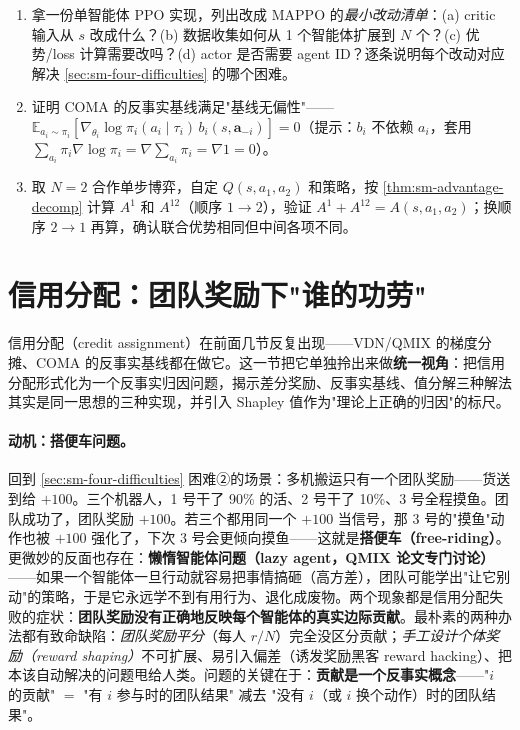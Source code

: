 \begin{practice}
\begin{enumerate}
  \item 拿一份单智能体 PPO 实现，列出改成 MAPPO 的\emph{最小改动清单}：(a) critic 输入从 $s$ 改成什么？(b) 数据收集如何从 1 个智能体扩展到 $N$ 个？(c) 优势/loss 计算需要改吗？(d) actor 是否需要 agent ID？逐条说明每个改动对应解决 \cref{sec:sm-four-difficulties} 的哪个困难。
  \item 证明 COMA 的反事实基线满足"基线无偏性"——$\mathbb{E}_{a_i\sim\pi_i}[\nabla_{\theta_i}\log\pi_i(a_i\mid\tau_i)\,b_i(s,\mathbf{a}_{-i})]=0$（提示：$b_i$ 不依赖 $a_i$，套用 $\sum_{a_i}\pi_i\nabla\log\pi_i=\nabla\sum_{a_i}\pi_i=\nabla 1=0$）。
  \item 取 $N=2$ 合作单步博弈，自定 $Q(s,a_1,a_2)$ 和策略，按 \cref{thm:sm-advantage-decomp} 计算 $A^1$ 和 $A^{12}$（顺序 $1\to2$），验证 $A^1+A^{12}=A(s,a_1,a_2)$；换顺序 $2\to1$ 再算，确认联合优势相同但中间各项不同。
\end{enumerate}
\end{practice}

\section{信用分配：团队奖励下"谁的功劳"}
\label{sec:sm-credit}

信用分配（credit assignment）在前面几节反复出现——VDN/QMIX 的梯度分摊、COMA 的反事实基线都在做它。这一节把它单独拎出来做\textbf{统一视角}：把信用分配形式化为一个反事实归因问题，揭示差分奖励、反事实基线、值分解三种解法其实是同一思想的三种实现，并引入 Shapley 值作为"理论上正确的归因"的标尺。

\paragraph{动机：搭便车问题。}
回到 \cref{sec:sm-four-difficulties} 困难②的场景：多机搬运只有一个团队奖励——货送到给 $+100$。三个机器人，1 号干了 90\% 的活、2 号干了 10\%、3 号全程摸鱼。团队成功了，团队奖励 $+100$。若三个都用同一个 $+100$ 当信号，那 3 号的"摸鱼"动作也被 $+100$ 强化了，下次 3 号会更倾向摸鱼——这就是\textbf{搭便车（free-riding）}。更微妙的反面也存在：\textbf{懒惰智能体问题（lazy agent，QMIX 论文专门讨论\cite{rashid2018qmix}）}——如果一个智能体一旦行动就容易把事情搞砸（高方差），团队可能学出"让它别动"的策略，于是它永远学不到有用行为、退化成废物。两个现象都是信用分配失败的症状：\textbf{团队奖励没有正确地反映每个智能体的真实边际贡献}。最朴素的两种办法都有致命缺陷：\emph{团队奖励平分}（每人 $r/N$）完全没区分贡献；\emph{手工设计个体奖励（reward shaping）}不可扩展、易引入偏差（诱发奖励黑客 reward hacking）、把本该自动解决的问题甩给人类。问题的关键在于：\textbf{贡献是一个反事实概念}——"$i$ 的贡献" $=$ "有 $i$ 参与时的团队结果" 减去 "没有 $i$（或 $i$ 换个动作）时的团队结果"。

